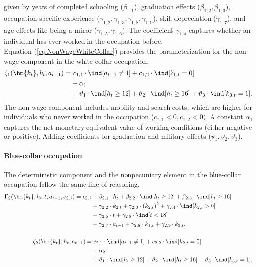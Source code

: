 given by years of completed schooling ($\beta_{1,1}$), graduation effects ($\beta_{1,2}, \beta_{1,3}$), occupation-specific experience ($\gamma_{1,2}, \gamma_{1,3},  \gamma_{1,8}, \gamma_{1,9}$), skill depreciation ($\gamma_{1,7}$), and age effects like being a minor ($\gamma_{1,5}, \gamma_{1,6}$). The coefficient $\gamma_{1,4}$ captures whether an individual has ever worked in the occupation before.\\

Equation (\ref{eq:NonWageWhiteCollar}) provides the parameterization for the non-wage component in the white-collar occupation.
%
\begin{align}\label{eq:NonWageWhiteCollar}
\zeta_{1}(\bm{k_t}, h_t, a_{t-1}) = &~c_{1,1} \cdot \ind[a_{t-1} \neq 1] + c_{1,2} \cdot \ind[k_{1,t} = 0] \nonumber \\
                            & + \alpha_1 \nonumber \\
                            & + \vartheta_1 \cdot \ind[h_t \geq 12] + \vartheta_2 \cdot \ind[h_t \geq 16] + \vartheta_3 \cdot \ind[k_{3,t} = 1].
\end{align}
%
The non-wage component includes mobility and search costs, which are higher for individuals who never worked in the occupation ($c_{1,1} < 0, c_{1,2}< 0)$. A constant $\alpha_1$ captures the net monetary-equivalent value of working conditions (either negative or positive). Adding coefficients for graduation and military effects ($\vartheta_{1}, \vartheta_{2}, \vartheta_{3}$).

\paragraph{Blue-collar occupation} The deterministic component and the nonpecuniary element in the blue-collar occupation follow the same line of reasoning.
%
\begin{align*} 
    \Gamma_2(\bm{k_t}, h_t, t, a_{t-1}, e_{2,j}) = e_{2,j} & + \beta_{2,1} \cdot h_t + \beta_{2, 2} \cdot \ind[h_t \geq 12] + \beta_{2,3} \cdot \ind[h_t\geq 16] \\
    							 & + \gamma_{2, 2} \cdot  k_{2,t} + \gamma_{2,3} \cdot  (k_{2,t})^2 + \gamma_{2,4} \cdot  \ind[k_{2,t} > 0] \\
                                   & + \gamma_{2,5} \cdot  t + \gamma_{2,6} \cdot \ind[t < 18] \\
                                  & + \gamma_{2,7} \cdot  a_{t-1} + \gamma_{2,8} \cdot  k_{1,t} + \gamma_{2,9} \cdot  k_{3,t}. \\
                                  &\\
\zeta_{2}( \bm{k_t}, h_t, a_{t-1} ) = &~c_{2,1} \cdot \ind[a_{t-1} \neq 1] + c_{2,2} \cdot \ind[k_{2,t} = 0] \\
                            & + \alpha_2 \\
                            & + \vartheta_1 \cdot \ind[h_t \geq 12] + \vartheta_2 \cdot \ind[h_t \geq 16] + \vartheta_3 \cdot \ind[k_{3,t} = 1].
\end{align*}


